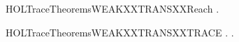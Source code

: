 \newcommand{\HOLTraceTheoremsWEAKXXTRANSXXINXXNODES}{\UseVerbatim{HOLTraceTheoremsWEAKXXTRANSXXINXXNODES}}
\begin{SaveVerbatim}{HOLTraceTheoremsWEAKXXTRANSXXReach}
\HOLTokenTurnstile{} \HOLSymConst{\HOLTokenForall{}}  .  \HOLTokenWeakTransBegin{}\HOLTokenWeakTransEnd {} \HOLSymConst{\HOLTokenImp{}}   
\end{SaveVerbatim}
\newcommand{\HOLTraceTheoremsWEAKXXTRANSXXReach}{\UseVerbatim{HOLTraceTheoremsWEAKXXTRANSXXReach}}
\begin{SaveVerbatim}{HOLTraceTheoremsWEAKXXTRANSXXTRACE}
\HOLTokenTurnstile{} \HOLSymConst{\HOLTokenForall{}}  .  \HOLTokenWeakTransBegin{}\HOLTokenWeakTransEnd {} \HOLSymConst{\HOLTokenImp{}} \HOLSymConst{\HOLTokenExists{}}.    
\end{SaveVerbatim}
\newcommand{\HOLTraceTheoremsWEAKXXTRANSXXTRACE}{\UseVerbatim{HOLTraceTheoremsWEAKXXTRANSXXTRACE}}
